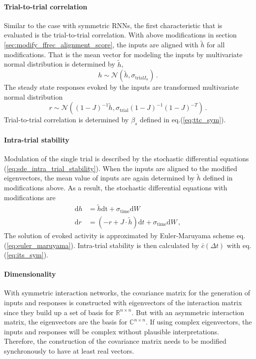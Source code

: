 \documentclass[11pt]{article}
\begin{document}
	\paragraph{Trial-to-trial correlation} 
	Similar to the case with symmetric RNNs, the first characteristic that is evaluated is the trial-to-trial correlation. With above modifications in section \ref{sec:modify_ffrec_alignment_score}, the inputs are aligned with $\tilde{h}$ for all modifications. That is the mean vector for modeling the inputs by multivariate normal distribution is determined by $\tilde{h}$, 
		\begin{equation}
				h \sim \mathcal{N}(\tilde{h}, \sigma_{\text{trial}I_n}) \, .
		\end{equation}
		The steady state responses evoked by the inputs are transformed multivariate normal distribution
		\begin{equation}
				r \sim \mathcal{N}\left((1-J)^{-1}\tilde{h}, \sigma_{\text{trial}} (1-J)^{-1} (1-J)^{-T}\right) \, .
		\end{equation}
	Trial-to-trial correlation is determined by $\beta_s$ defined in eq.(\ref{eq:ttc_sym}). 
	
	\paragraph{Intra-trial stability} Modulation of the single trial is described by the stochastic differential equations (\ref{eq:sde_intra_trial_stability}). When the inputs are aligned to the modified eigenvectors, the mean value of inputs are again determined by $\tilde{h}$ defined in modifications above. As a result, the stochastic differential equations with modifications are 
		\begin{subequations}
			\begin{align}
				\mathrm{d} h & = \tilde{h} \mathrm{dt} + \sigma_{\text{time}} \mathrm{d} W \\
				\mathrm{d} r & = (-r + J \cdot \tilde{h}) \mathrm{d}t + \sigma_{\text{time}} \mathrm{d} W \, ,
			\end{align}
		\end{subequations}
	The solution of evoked activity is approximated by Euler-Maruyama scheme eq.(\ref{eq:euler_maruyama}). Intra-trial stability is then calculated by $\bar{c}(\Delta t)$ with eq.(\ref{eq:its_sym}). 
	
	\paragraph{Dimensionality}%
	With symmetric interaction networks, the covariance matrix for the generation of inputs and responses is constructed with eigenvectors of the interaction matrix since they build up a set of basis for $\mathbb{R}^{n \times n}$. But with an asymmetric interaction matrix, the eigenvectors are the basis for $\mathbb{C}^{n \times n}$. If using complex eigenvectors, the inputs and responses will be complex without plausible interpretations. Therefore, the construction of the covariance matrix needs to be modified synchronously to have at least real vectors. 
				  
\end{document}
